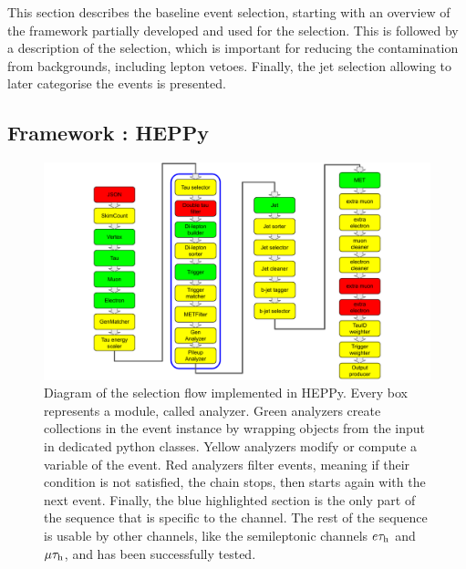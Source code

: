 This section describes the baseline event selection, starting with an overview of the framework partially developed and used for the selection. This is followed by a description of the selection, which is important for reducing the contamination from backgrounds, including lepton vetoes. Finally, the jet selection allowing to later categorise the events is presented.

\subsection{Framework : HEPPy}
\label{sec:heppy}

\begin{figure}
    \centering
    \includegraphics[width=\textwidth]{Images/HEPPY_diagram.pdf}
    \caption{Diagram of the selection flow implemented in HEPPy. Every box represents a module, called analyzer. Green analyzers create collections in the event instance by wrapping objects from the input in dedicated python classes. Yellow analyzers modify or compute a variable of the event. Red analyzers filter events, meaning if their condition is not satisfied, the chain stops, then starts again with the next event. Finally, the blue highlighted section is the only part of the sequence that is specific to the \tauh\tauh channel. The rest of the sequence is usable by other channels, like the semileptonic channels $e\tau_{\rm h}$ and $\mu\tau_{\rm h}$, and has been successfully tested.}
    \label{fig:HEPPY}
\end{figure}

